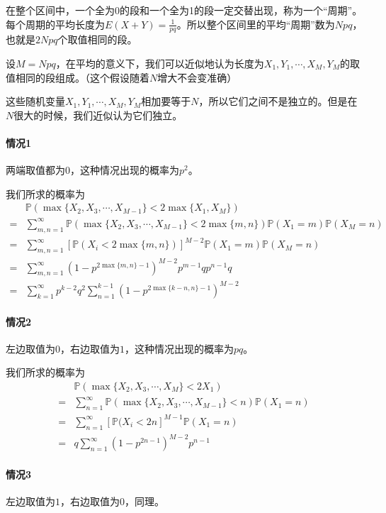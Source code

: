 \documentclass[12pt,a4paper]{article}
\begin{document}
在整个区间中，一个全为0的段和一个全为1的段一定交替出现，称为一个“周期”。每个周期的平均长度为$E(X+Y) = \frac{1}{p q}$。所以整个区间里的平均“周期”数为$N p q$，也就是$2 N p q$个取值相同的段。

设$M = N p q$，在平均的意义下，我们可以近似地认为长度为$X_1, Y_1, \cdots, X_M, Y_M$的取值相同的段组成。（这个假设随着$N$增大不会变准确）

这些随机变量$X_1, Y_1, \cdots, X_M, Y_M$相加要等于$N$，所以它们之间不是独立的。但是在$N$很大的时候，我们近似认为它们独立。

\paragraph*{情况1}
两端取值都为$0$，这种情况出现的概率为$p^2$。

我们所求的概率为
\begin{align*}
  & \mathbb{P}(\max\{X_2, X_3, \cdots, X_{M-1}\} < 2 \max\{X_1, X_M\}) \\
= & \sum_{m,n=1}^{\infty} \mathbb{P}(\max\{X_2, X_3, \cdots, X_{M-1}\} < 2 \max\{m,  n\}) \mathbb{P}(X_1 = m) \mathbb{P}(X_M = n) \\
= & \sum_{m,n=1}^{\infty} [\mathbb{P}(X_i < 2 \max\{m,n\}) ]^{M-2} \mathbb{P}(X_1 = m) \mathbb{P}(X_M = n)\\
= & \sum_{m,n=1}^{\infty} (1 - p^{2 \max\{m,n\}-1})^{M-2} p^{m-1} q p^{n-1} q\\
= & \sum_{k=1}^{\infty} p^{k-2} q^2 \sum_{n=1}^{k-1} (1 - p^{2 \max\{k-n,n\}-1})^{M-2} 
\end{align*}

\paragraph*{情况2}
左边取值为$0$，右边取值为$1$，这种情况出现的概率为$pq$。

我们所求的概率为
\begin{align*}
  & \mathbb{P}(\max\{X_2, X_3, \cdots, X_{M}\} < 2 X_1) \\
= & \sum_{n=1}^{\infty} \mathbb{P}(\max\{X_2, X_3, \cdots, X_{M-1}\} < n) \mathbb{P}(X_1 = n) \\
= & \sum_{n=1}^{\infty} [\mathbb{P}(X_i < 2 n]^{M-1} \mathbb{P}(X_1 = n)\\
= & q \sum_{n=1}^{\infty} (1 - p^{2 n-1})^{M-2} p^{n-1}
\end{align*}

\paragraph*{情况3}
左边取值为$1$，右边取值为$0$，同理。
\end{document}
